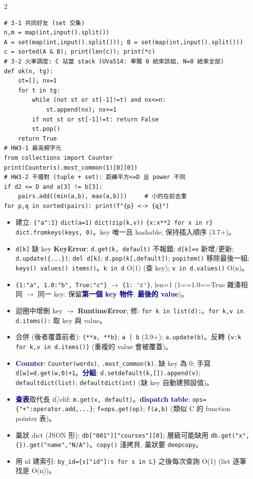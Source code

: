 \documentclass[12pt]{extarticle}
\newcommand{\py}{\lstinline[language={},basicstyle=\ttfamily\fontsize{10.5}{13}\selectfont\bfseries,backgroundcolor=\color{white}]}
\renewcommand{\sec}[1]{\par\vspace{3pt}\noindent{\setlength{\fboxsep}{2pt}\colorbox{navy}{\parbox{\dimexpr\linewidth-4pt}{\color{white}\bfseries\fontsize{13}{16}\selectfont #1}}}\par\vspace{2pt}}
\newcommand{\sub}[1]{\textcolor{navy}{\textbf{#1}}}
\newcommand{\warn}[1]{\textcolor{warn}{\textbf{#1}}}
\newcommand{\ra}{$\rightarrow$}
\newenvironment{bl}{\begin{itemize}[leftmargin=10pt,itemsep=1pt,parsep=0pt,topsep=1pt,partopsep=0pt,labelsep=3pt,label={\textbullet}]}{\end{itemize}}
\begin{document}
\begin{multicols*}{2}
\sec{Lab3 / HW3 模板}
\begin{lstlisting}
# 3-1 共同好友 (set 交集)
n,m = map(int,input().split())
A = set(map(int,input().split())); B = set(map(int,input().split()))
c = sorted(A & B); print(len(c)); print(*c)
# 3-2 火車調度: C 站當 stack (UVa514: 單獨 0 結束該組, N=0 結束全部)
def ok(n, tg):
    st=[]; nx=1
    for t in tg:
        while (not st or st[-1]!=t) and nx<=n:
            st.append(nx); nx+=1
        if not st or st[-1]!=t: return False
        st.pop()
    return True
# HW3-1 最高頻字元
from collections import Counter
print(Counter(s).most_common(1)[0][0])
# HW3-2 干擾對 (tuple + set): 距離平方<=D 且 power 不同
if d2 <= D and a[3] != b[3]:
    pairs.add((min(a,b), max(a,b)))     # 小的在前去重
for p,q in sorted(pairs): print(f"{p} <-> {q}")
\end{lstlisting}

\sec{9. Dict (Lec4)}
\begin{bl}
\item 建立: \py|{"a":1}| \py|dict(a=1)| \py|dict(zip(k,v))| \py|{x:x**2 for x in r}| \py|dict.fromkeys(keys, 0)|。key 唯一且 hashable; 保持插入順序 (3.7+)。
\item \py|d[k]| 缺 key \warn{KeyError}; \py|d.get(k, default)| 不報錯; \py|d[k]=v| 新增/更新; \py|d.update({...})|; \py|del d[k]|; \py|d.pop(k[,default])|; \py|popitem()| 移除最後一組; \py|keys() values() items()|。\py|k in d| O(1) (查 key); \py|v in d.values()| O(n)。
\item \py|{1:"a", 1.0:"b", True:"c"}| \ra{} \py|{1: 'c'}|, len=1 (1==1.0==True 雜湊相同 \ra{} 同一 key: 保留\sub{第一個 key 物件}, \sub{最後的 value})。
\item 迴圈中增刪 key \ra{} \warn{RuntimeError}; 修: \py|for k in list(d):|。\py|for k,v in d.items():| 取 key 與 value。
\item 合併 (後者覆蓋前者): \py|{**a, **b}|; \py/a | b/ (3.9+); \py|a.update(b)|。反轉 \py|{v:k for k,v in d.items()}| (重複的 value 會被覆蓋)。
\item \sub{Counter}: \py|Counter(words)|, \py|.most_common(k)|, 缺 key 為 0; 手寫 \py|d[w]=d.get(w,0)+1|。\sub{分組}: \py|d.setdefault(k,[]).append(v)|; \py|defaultdict(list)|; \py|defaultdict(int)| (缺 key 自動建預設值)。
\item \sub{查表}取代長 if/elif: \py|m.get(x, default)|。\sub{dispatch table}: \py|ops={"+":operator.add,...}|; \py|f=ops.get(op)|; \py|f(a,b)| (類似 C 的 function pointer 表)。
\item 巢狀 dict (JSON 形): \py|db["001"]["courses"][0]|; 層級可能缺用 \py|db.get("x",{}).get("name","N/A")|。\py|copy()| 淺拷貝, 巢狀要 \py|deepcopy|。
\item 用 id 建索引: \py|by_id={s["id"]:s for s in L}| 之後每次查詢 O(1) (list 逐筆找是 O(n))。
\end{bl}


\end{multicols*}
\end{document}
